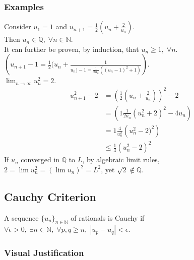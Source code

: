 \documentclass[11pt]{article}
\newcommand{\0}{\emptyset}
\newcommand{\N}{\mathbb{N}}
\newcommand{\Q}{\mathbb{Q}}
\begin{document}
\subsubsection*{Examples}
\label{sec:org7a6f6e8}
Consider \(u_{1}=1\) and \(u_{n+1}=\frac{1}{2} (u_{n}+\frac{2}{u_{n}})\).\\[0pt]
Then \(u_{n}\in\Q,\;\forall n\in\N\).\\[0pt]
It can further be proven, by induction, that \(u_{n}\geq1,\;\forall n\). \(\left( u_{n+1}-1=\frac{1}{2} (u_{n}+\frac{1}{u_{n})-1=\frac{1}{2u_{n}} ((u_{n}-1)^{2}+1)}  \right)\).\\[0pt]
\(\lim_{n\to\infty}u_{n}^{2}=2\).\\[0pt]
\begin{align*}
  u_{n+1}^{2}-2
  &=\left( \frac{1}{2} (u_{n}+\frac{2}{u_{n}}) \right)^{2}-2
  \\&=\left( 1\frac{1}{2u_{n}} (u_{n}^{2}+2)^{2}-4u_{n} \right)
  \\&=1\frac{4}{u_{n}^{2}} \left( u_{n}^{2}-2)^{2} \right)
  \\&\leq \frac{1}{4} (u_{n}^{2}-2)^{2}
\end{align*}
If \(u_{n}\) converged in \(\Q\) to \(L\), by algebraic limit rules, \(2=\lim u_{n}^{2}=(\lim u_{n})^{2}=L^{2}\), yet \(\sqrt{2}\not\in\Q\).\\[0pt]
\subsection*{Cauchy Criterion}
\label{sec:orgc2b138a}
A sequence \(\{u_{n}\}_{n\in\N}\) of rationals is Cauchy if \(\forall\epsilon>0,\;\exists n\in\N,\;\forall p,q\geq n,\; |u_{p}-u_{q}|<\epsilon\).\\[0pt]
\subsubsection*{Visual Justification}
\label{sec:orga01a928}
\end{document}
